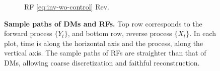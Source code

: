 \documentclass{article} %
\theoremstyle{plain}
\begin{document}
\begin{figure}[!tbh]
\begin{subfigure}[b]{0.24\columnwidth}
        \caption{RF \eqref{eq:inv-wo-control} Rev.}
     \end{subfigure}
     \caption{
     \textbf{Sample paths of DMs and RFs.}
     Top row corresponds to the forward process $\{Y_t\}$, and bottom row, reverse process $\{X_t\}$.
     In each plot, time is along the horizontal axis and the process, along the vertical axis.
     The sample paths of RFs are straighter than that of DMs, allowing coarse discretization and faithful reconstruction. 
     }
    \label{fig:comp-dm-rf}
\end{figure}
\end{document}
